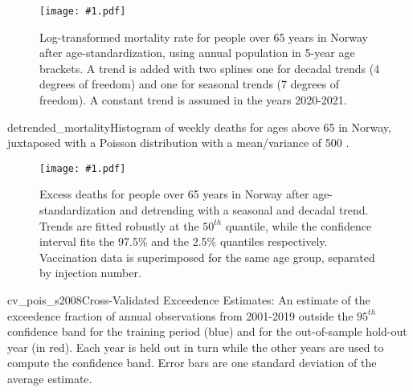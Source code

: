 \documentclass{article}
\newcommand{\insertPdfFig}[3]{
  \begin{figure}[h]
  \centering
  \texttt{[image: \#1.pdf]}
  \caption{#2}
  \label{fig:#1}
  \end{figure}
}
\begin{document}
\insertPdfFig{norway_ln_mort_rate_2001_2021}{Log-transformed mortality rate for people over 65 years in Norway after age-standardization, using annual population in 5-year age brackets. A trend is added with two splines one for decadal trends (4 degrees of freedom) and one for seasonal trends (7 degrees of freedom). A constant trend is assumed in the years 2020-2021.}


\insertPdfFig{detrended_mortality}{Histogram of weekly deaths for ages above 65 in Norway, juxtaposed with a Poisson distribution with a mean/variance of 500
.}

\insertPdfFig{norway_excess_deaths_pois}{Excess deaths for people over 65 years in Norway after age-standardization and detrending with a seasonal and decadal trend. Trends are fitted robustly at the $50^{th}$ quantile, while the confidence interval fits the 97.5\% and the 2.5\% quantiles respectively. Vaccination data is superimposed for the same age group, separated by injection number.}


\insertPdfFig{cv_pois_s2008}{Cross-Validated Exceedence Estimates: An estimate of the exceedence fraction of annual observations from 2001-2019 outside the $95^{th}$ confidence band for the training period (blue) and for the out-of-sample hold-out year (in red). Each year is held out in turn while the other years are used to compute the confidence band. Error bars are one standard deviation of the average estimate.}






\end{document}
